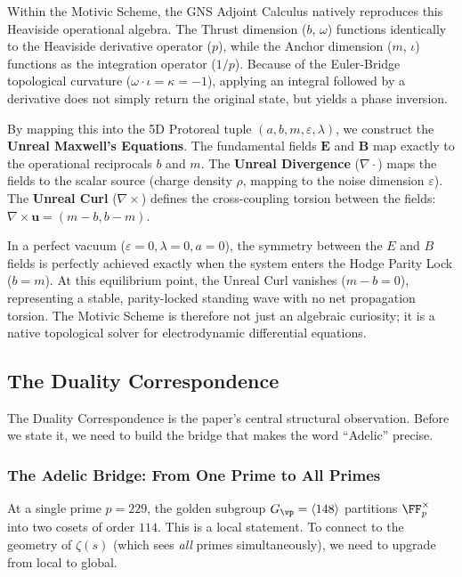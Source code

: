 Within the Motivic Scheme, the GNS Adjoint Calculus natively reproduces this Heaviside operational algebra. The Thrust dimension ($b$, $\omega$) functions identically to the Heaviside derivative operator ($p$), while the Anchor dimension ($m$, $\iota$) functions as the integration operator ($1/p$). Because of the Euler-Bridge topological curvature ($\omega \cdot \iota = \kappa = -1$), applying an integral followed by a derivative does not simply return the original state, but yields a phase inversion.

By mapping this into the 5D Protoreal tuple $(a, b, m, \varepsilon, \lambda)$, we construct the \textbf{Unreal Maxwell's Equations}. The fundamental fields $\mathbf{E}$ and $\mathbf{B}$ map exactly to the operational reciprocals $b$ and $m$. The \textbf{Unreal Divergence} ($\nabla \cdot$) maps the fields to the scalar source (charge density $\rho$, mapping to the noise dimension $\varepsilon$). The \textbf{Unreal Curl} ($\nabla \times$) defines the cross-coupling torsion between the fields: $\nabla \times \mathbf{u} = (m - b, b - m)$.

In a perfect vacuum ($\varepsilon = 0, \lambda = 0, a = 0$), the symmetry between the $E$ and $B$ fields is perfectly achieved exactly when the system enters the Hodge Parity Lock ($b = m$). At this equilibrium point, the Unreal Curl vanishes ($m - b = 0$), representing a stable, parity-locked standing wave with no net propagation torsion. The Motivic Scheme is therefore not just an algebraic curiosity; it is a native topological solver for electrodynamic differential equations.

\subsection{The Duality Correspondence}

The Duality Correspondence is the paper's central structural observation. Before we state it, we need to build the bridge that makes the word ``Adelic'' precise.

\subsubsection*{The Adelic Bridge: From One Prime to All Primes}

At a single prime $p = 229$, the golden subgroup $G_\vp = \langle 148 \rangle$ partitions $\FF_p^\times$ into two cosets of order $114$. This is a local statement. To connect to the geometry of $\zeta(s)$ (which sees \emph{all} primes simultaneously), we need to upgrade from local to global.

